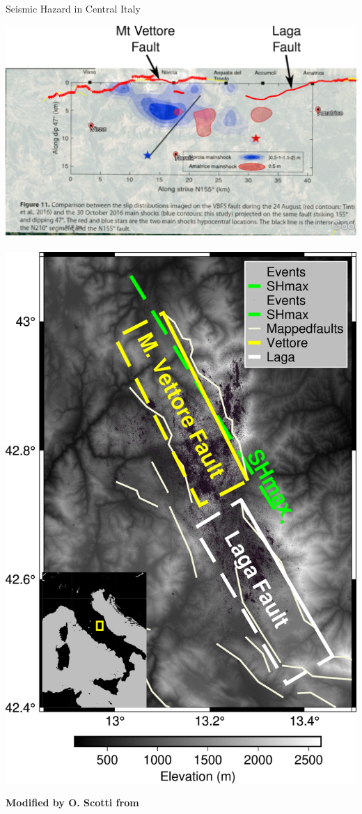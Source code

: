 \documentclass{beamer}
\begin{document}
\begin{frame}
 {Seismic Hazard in Central Italy}
 
 \begin{center}
  \includegraphics[width=0.65\linewidth]{images/amatrice_1.pdf} \,
  \includegraphics[width=0.3\linewidth]{images/map_italy.png}  
 \end{center}
  \vskip 0.2cm
  {\bf \hfill \scriptsize Modified by O. Scotti from \cite{Scognamiglio_2018_CFG}}
  
\end{frame}
\end{document}
